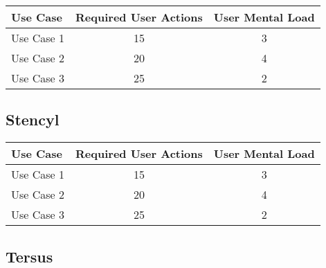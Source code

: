 \begin{tabular*}{\textwidth}{lcc}
\textbf{Use Case} & \textbf{Required User Actions} & \textbf{User Mental Load}\\
\hline
Use Case 1                          & 15 & 3 \\
Use Case 2                          & 20 & 4 \\
Use Case 3                          & 25 & 2
\end{tabular*}

\subsection{Stencyl}




\begin{tabular*}{\textwidth}{lcc}
\textbf{Use Case} & \textbf{Required User Actions} & \textbf{User Mental Load}\\
\hline
Use Case 1                          & 15 & 3 \\
Use Case 2                          & 20 & 4 \\
Use Case 3                          & 25 & 2
\end{tabular*}

\subsection{Tersus}


